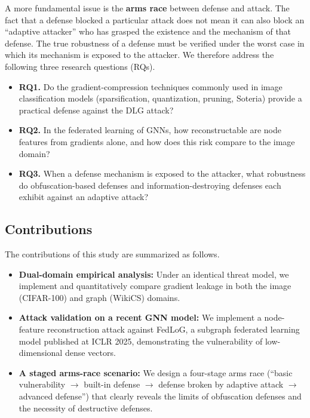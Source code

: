 \documentclass[conference]{IEEEtran}
\begin{document}
A more fundamental issue is the \textbf{arms race} between defense and attack.
The fact that a defense blocked a particular attack does not mean it can also
block an ``adaptive attacker'' who has grasped the existence and the mechanism
of that defense. The true robustness of a defense must be verified under the
worst case in which its mechanism is exposed to the attacker. We therefore
address the following three research questions (RQs).

\begin{itemize}
\item \textbf{RQ1.} Do the gradient-compression techniques commonly used in
image classification models (sparsification, quantization, pruning, Soteria)
provide a practical defense against the DLG attack?
\item \textbf{RQ2.} In the federated learning of GNNs, how reconstructable are
node features from gradients alone, and how does this risk compare to the image
domain?
\item \textbf{RQ3.} When a defense mechanism is exposed to the attacker, what
robustness do obfuscation-based defenses and information-destroying defenses
each exhibit against an adaptive attack?
\end{itemize}

\subsection{Contributions}
The contributions of this study are summarized as follows.
\begin{itemize}
\item \textbf{Dual-domain empirical analysis:} Under an identical threat model,
we implement and quantitatively compare gradient leakage in both the image
(CIFAR-100) and graph (WikiCS) domains.
\item \textbf{Attack validation on a recent GNN model:} We implement a
node-feature reconstruction attack against FedLoG, a subgraph federated learning
model published at ICLR 2025, demonstrating the vulnerability of low-dimensional
dense vectors.
\item \textbf{A staged arms-race scenario:} We design a four-stage arms race
(``basic vulnerability $\rightarrow$ built-in defense $\rightarrow$ defense
broken by adaptive attack $\rightarrow$ advanced defense'') that clearly reveals
the limits of obfuscation defenses and the necessity of destructive defenses.
\end{itemize}
\end{document}

